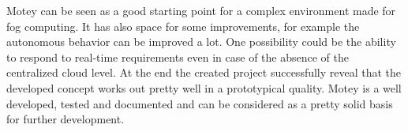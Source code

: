 Motey can be seen as a good starting point for a complex environment made for fog computing.
It has also space for some improvements, for example the autonomous behavior can be improved a lot.
One possibility could be the ability to respond to real-time requirements even in case of the absence of the centralized cloud level.
At the end the created project successfully reveal that the developed concept works out pretty well in a prototypical quality.
Motey is a well developed, tested and documented and can be considered as a pretty solid basis for further development.
